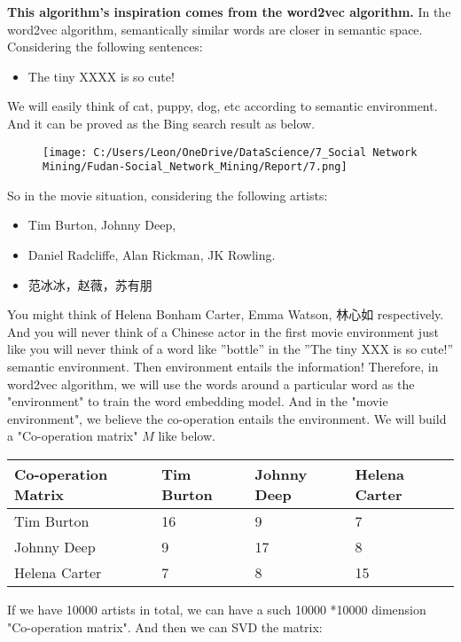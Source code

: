 \documentclass[]{article}
\begin{document}
\textbf{This algorithm's inspiration comes from the word2vec algorithm.}
In the word2vec algorithm, semantically similar words are closer in
semantic space. Considering the following sentences:

\begin{itemize}
\item
  The tiny XXXX is so cute!
\end{itemize}

We will easily think of cat, puppy, dog, etc according to semantic
environment. And it can be proved as the Bing search result as below.

\begin{figure}
\centering
\texttt{[image: C:/Users/Leon/OneDrive/DataScience/7\_Social Network Mining/Fudan-Social\_Network\_Mining/Report/7.png]}
\caption{}
\end{figure}

So in the movie situation, considering the following artists:

\begin{itemize}
\item
  Tim Burton, Johnny Deep,
\item
  Daniel Radcliffe, Alan Rickman, JK Rowling.
\item
  范冰冰，赵薇，苏有朋
\end{itemize}

You might think of Helena Bonham Carter, Emma Watson, 林心如
respectively. And you will never think of a Chinese actor in the first
movie environment just like you will never think of a word like
''bottle'' in the ''The tiny XXX is so cute!'' semantic environment.
Then environment entails the information! Therefore, in word2vec
algorithm, we will use the words around a particular word as the
"environment" to train the word embedding model. And in the "movie
environment", we believe the co-operation entails the environment. We
will build a "Co-operation matrix" \(M\) like below.

\begin{longtable}[]{@{}llll@{}}
\toprule
Co-operation Matrix & Tim Burton & Johnny Deep & Helena
Carter\tabularnewline
\midrule
\endhead
Tim Burton & 16 & 9 & 7\tabularnewline
Johnny Deep & 9 & 17 & 8\tabularnewline
Helena Carter & 7 & 8 & 15\tabularnewline
\bottomrule
\end{longtable}

If we have 10000 artists in total, we can have a such 10000 *10000
dimension "Co-operation matrix". And then we can SVD the matrix:
\end{document}
